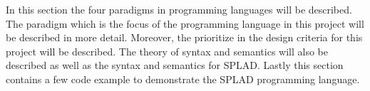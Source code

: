 In this section the four paradigms in programming languages will be described. The paradigm which is the focus of the programming language in this project will be described in more detail. Moreover, the prioritize in the design criteria for this project will be described. The theory of syntax and semantics will also be described as well as the syntax and semantics for SPLAD. Lastly this section contains a few code example to demonstrate the SPLAD programming language. 